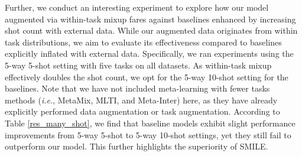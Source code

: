 Further, %
we conduct an interesting experiment to explore how our model augmented via within-task mixup fares against baselines enhanced by increasing shot count with external data. While our augmented data originates from within task distributions, we aim to evaluate its effectiveness compared to baselines explicitly inflated with external data. Specifically, we ran experiments using the 5-way 5-shot setting with five tasks on all datasets. As within-task mixup effectively doubles the shot count, we opt for the 5-way 10-shot setting for the baselines. %
Note that we have not included meta-learning with fewer tasks methods (\textit{i.e.}, MetaMix, MLTI, and Meta-Inter) here, as they have already explicitly performed data augmentation or task augmentation. According to Table \ref{res_many_shot}, we find that baseline models exhibit slight performance improvements from 5-way 5-shot to 5-way 10-shot settings, yet they still fail to outperform our model. This further highlights the superiority of SMILE. %


